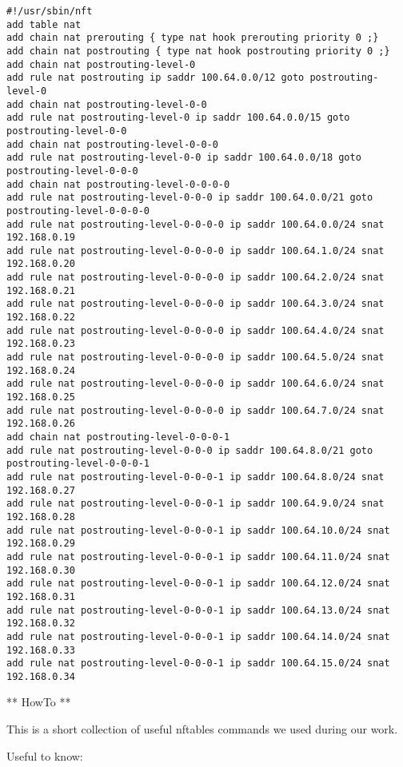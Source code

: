\begin{verbatim}
#!/usr/sbin/nft
add table nat
add chain nat prerouting { type nat hook prerouting priority 0 ;}
add chain nat postrouting { type nat hook postrouting priority 0 ;}
add chain nat postrouting-level-0
add rule nat postrouting ip saddr 100.64.0.0/12 goto postrouting-level-0
add chain nat postrouting-level-0-0
add rule nat postrouting-level-0 ip saddr 100.64.0.0/15 goto postrouting-level-0-0
add chain nat postrouting-level-0-0-0
add rule nat postrouting-level-0-0 ip saddr 100.64.0.0/18 goto postrouting-level-0-0-0
add chain nat postrouting-level-0-0-0-0
add rule nat postrouting-level-0-0-0 ip saddr 100.64.0.0/21 goto postrouting-level-0-0-0-0
add rule nat postrouting-level-0-0-0-0 ip saddr 100.64.0.0/24 snat 192.168.0.19
add rule nat postrouting-level-0-0-0-0 ip saddr 100.64.1.0/24 snat 192.168.0.20
add rule nat postrouting-level-0-0-0-0 ip saddr 100.64.2.0/24 snat 192.168.0.21
add rule nat postrouting-level-0-0-0-0 ip saddr 100.64.3.0/24 snat 192.168.0.22
add rule nat postrouting-level-0-0-0-0 ip saddr 100.64.4.0/24 snat 192.168.0.23
add rule nat postrouting-level-0-0-0-0 ip saddr 100.64.5.0/24 snat 192.168.0.24
add rule nat postrouting-level-0-0-0-0 ip saddr 100.64.6.0/24 snat 192.168.0.25
add rule nat postrouting-level-0-0-0-0 ip saddr 100.64.7.0/24 snat 192.168.0.26
add chain nat postrouting-level-0-0-0-1
add rule nat postrouting-level-0-0-0 ip saddr 100.64.8.0/21 goto postrouting-level-0-0-0-1
add rule nat postrouting-level-0-0-0-1 ip saddr 100.64.8.0/24 snat 192.168.0.27
add rule nat postrouting-level-0-0-0-1 ip saddr 100.64.9.0/24 snat 192.168.0.28
add rule nat postrouting-level-0-0-0-1 ip saddr 100.64.10.0/24 snat 192.168.0.29
add rule nat postrouting-level-0-0-0-1 ip saddr 100.64.11.0/24 snat 192.168.0.30
add rule nat postrouting-level-0-0-0-1 ip saddr 100.64.12.0/24 snat 192.168.0.31
add rule nat postrouting-level-0-0-0-1 ip saddr 100.64.13.0/24 snat 192.168.0.32
add rule nat postrouting-level-0-0-0-1 ip saddr 100.64.14.0/24 snat 192.168.0.33
add rule nat postrouting-level-0-0-0-1 ip saddr 100.64.15.0/24 snat 192.168.0.34
\end{verbatim}

** HowTo **

This is a short collection of useful nftables commands we used during
our work.

Useful to know:

